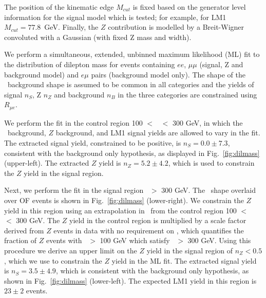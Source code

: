The position of the kinematic edge $M_{cut}$ is fixed based on the generator level
information for the signal model which is tested; for example, for LM1 
$M_{cut} = 77.8$~GeV. Finally, the $Z$ contribution is modelled by a Breit-Wigner 
convoluted with a Gaussian (with fixed Z mass and width). 

We perform a simultaneous, extended, unbinned maximum 
likelihood (ML) fit to the distribution of dilepton mass for events containing $ee$, $\mu\mu$ 
(signal, Z and background model)
and $e\mu$ pairs (background model only). 
The shape of the \ttbar\ background shape is assumed to be common in all categories
and the yields of signal $n_S$, Z $n_Z$ and background $n_B$ 
in the three categories are constrained using $R_{\mu e}$. 

We perform the fit in the control region 100 $<$ \Ht\ $<$ 300 GeV, in
which the \ttbar\ background, $Z$ background, and LM1 signal yields are allowed to vary in the fit. 
The extracted signal yield, constrained to be positive, is $n_S = 0.0 \pm 7.3$, 
consistent with the background only 
hypothesis, as displayed in Fig.~\ref{fig:dilmass} (upper-left). 
The extracted $Z$ yield is $n_Z = 5.2 \pm 4.2$, which is 
used to constrain the $Z$ yield in the signal region. 

Next, we perform the fit in the signal region \Ht\ $>$ 300 GeV. The \ttbar\ shape
overlaid over OF events is shown in Fig.~\ref{fig:dilmass} (lower-right). We
constrain the $Z$ yield in this region using an extrapolation in \Ht\ from the 
control region 100 $<$ \Ht\ $<$ 300 GeV. The $Z$ yield in the control region is
multiplied by a scale factor derived from $Z$ events in data with no requirement
on \MET, which quantifies the fraction of $Z$ events with \Ht\ $>$ 100 GeV which 
satisfy \Ht\ $>$ 300 GeV. Using this procedure we derive an upper limit on the
$Z$ yield in the signal region of $n_Z < 0.5$, which we use to constrain the
$Z$ yield in the ML fit. The extracted signal yield is $n_S = 3.5 \pm 4.9$,
which is consistent with the background only hypothesis,
as shown in Fig.~\ref{fig:dilmass} (lower-left). The expected LM1
yield in this region is $23\pm2 $ events.
